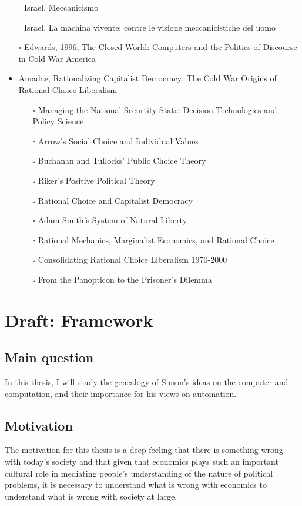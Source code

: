 \documentclass[paper=B6,portrait,twoside=true,twocolumn=false,headinclude=true,footinclude=false,fontsize=12,BCOR=10mm,DIV=calc,pagesize=auto,titlepage=firstiscover,mpinclude=false,headings=normal,headings=twolinechapter,open=right,toc=graduated,chapterprefix=false,numbers=endperiod,parskip=half+]{scrbook}
\theoremstyle{definition}
\begin{document}
\begin{itemize}
\item[{$\square$}] Israel,  Meccanicismo
\item[{$\square$}] Israel, La machina vivente: contre le visione meccanicistiche del uomo
\item[{$\square$}] Edwards, 1996, The Closed World: Computers and the Politics of Discourse in Cold War America
\item\relax [0/9] Amadae, Rationalizing Capitalist Democracy: The Cold War Origins of
Rational Choice Liberalism
\begin{itemize}
\item[{$\square$}] Managing the National Securtity State: Decision Technologies and Policy Science
\item[{$\square$}] Arrow's Social Choice and Individual Values
\item[{$\square$}] Buchanan and Tullocks' Public Choice Theory
\item[{$\square$}] Riker's Positive Political Theory
\item[{$\square$}] Rational Choice and Capitalist Democracy
\item[{$\square$}] Adam Smith's System of Natural Liberty
\item[{$\square$}] Rational Mechanics, Marginalist Economics, and Rational Choice
\item[{$\square$}] Consolidating Rational Choice Liberalism 1970-2000
\item[{$\square$}] From the Panopticon to the Prisoner's Dilemma
\end{itemize}
\end{itemize}
\chapter{Draft: Framework}
\label{sec:org10021f9}
\section{Main question}
\label{sec:orgdee2648}
In this thesis, I will study the genealogy of Simon's ideas on the computer
and computation, and their importance for his views on automation. 
\section{Motivation}
\label{sec:org805b1bc}
The motivation for this thesis is a deep feeling that there is something
wrong with today's society and that given that economics plays such an
important cultural role in mediating people's understanding of the nature
of political problems, it is necessary to understand what is wrong with
economics to understand what is wrong with society at large. 
\end{document}
